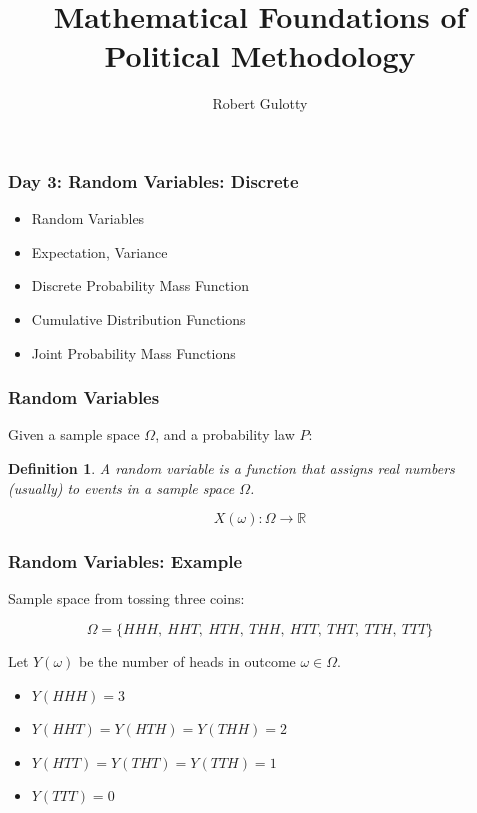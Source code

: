 \documentclass{beamer}
\title[PLSC 43401]{Mathematical Foundations of Political Methodology}
\author{Robert Gulotty}
\institute[Chicago]{University of Chicago}
\newtheorem{defn}{Definition}
\numberwithin{equation}{section}
\begin{document}
\begin{frame}
\maketitle
\end{frame}


\begin{frame}
\frametitle{Day 3: Random Variables: Discrete}

\begin{itemize}
\item Random Variables
\item Expectation, Variance
\item Discrete Probability Mass Function
\item Cumulative Distribution Functions
\item Joint Probability Mass Functions
\end{itemize}
\end{frame}


\begin{frame}
\frametitle{Random Variables}
Given a sample space $\Omega$, and a probability law $P$:
\begin{defn}
A \emph{random variable} is a \alert{function} that assigns real numbers (usually) to events in a sample space $\Omega$.
\end{defn}
$$X(\omega): \Omega \to \mathbb{R}$$

\end{frame}



\begin{frame}
\frametitle{Random Variables: Example}
Sample space from tossing three coins: 

$$\Omega=\{ HHH,\ HHT,\ HTH,\ THH,\ HTT,\ THT,\ TTH,\ TTT\}$$

Let $Y(\omega)$ be the number of heads in outcome $\omega \in \Omega$.\pause

\begin{itemize}
\item $Y(HHH)=3$\pause
\item $Y(HHT)=Y(HTH)=Y(THH)=2$\pause
\item $Y(HTT)= Y(THT)=Y(TTH)=1$\pause
\item $Y(TTT)=0$
\end{itemize}
\end{frame}
\end{document}
